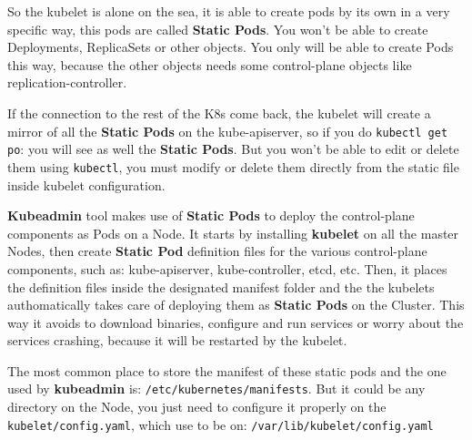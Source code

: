 \documentclass{article}
\begin{document}
So the kubelet is alone on the sea, it is able to create pods by its own in a very specific way, this pods are called \textbf{Static Pods}. You won't be able to create Deployments, ReplicaSets or other objects. You only will be able to create Pods this way, because the other objects needs some control-plane objects like replication-controller. 

If the connection to the rest of the K8s come back, the kubelet will create a mirror of all the \textbf{Static Pods} on the kube-apiserver, so if you do \verb|kubectl get po|: you will see as well the \textbf{Static Pods}. But you won't be able to edit or delete them using \verb|kubectl|, you must modify or delete them directly from the static file inside kubelet configuration.

\textbf{Kubeadmin} tool makes use of \textbf{Static Pods} to deploy the control-plane components as Pods on a Node. It starts by installing \textbf{kubelet} on all the master Nodes, then create \textbf{Static Pod} definition files for the various control-plane components, such as: kube-apiserver, kube-controller, etcd, etc.
Then, it places the definition files inside the designated manifest folder and the the kubelets authomatically takes care of deploying
them as \textbf{Static Pods} on the Cluster. This way it avoids to download binaries, configure and run services or worry about the services crashing,
because it will be restarted by the kubelet.

The most common place to store the manifest of these static pods and the one used by \textbf{kubeadmin} is: \verb|/etc/kubernetes/manifests|. But it could be any directory on the Node, you just need to configure it properly on the \verb|kubelet/config.yaml|, which use to be on: \verb|/var/lib/kubelet/config.yaml|
\end{document}
